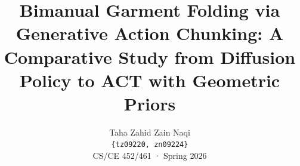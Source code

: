 \documentclass[10pt,twocolumn,letterpaper]{article}
\title{Bimanual Garment Folding via Generative Action Chunking: A Comparative Study from Diffusion Policy to ACT with Geometric Priors}
\author{Taha Zahid \qquad Zain Naqi \\
{\tt\small \{tz09220, zn09224\}} \\
{\small CS/CE 452/461 · Spring 2026}
}
\begin{document}
\maketitle

    






{
    \small
    
    
}
\end{document}
